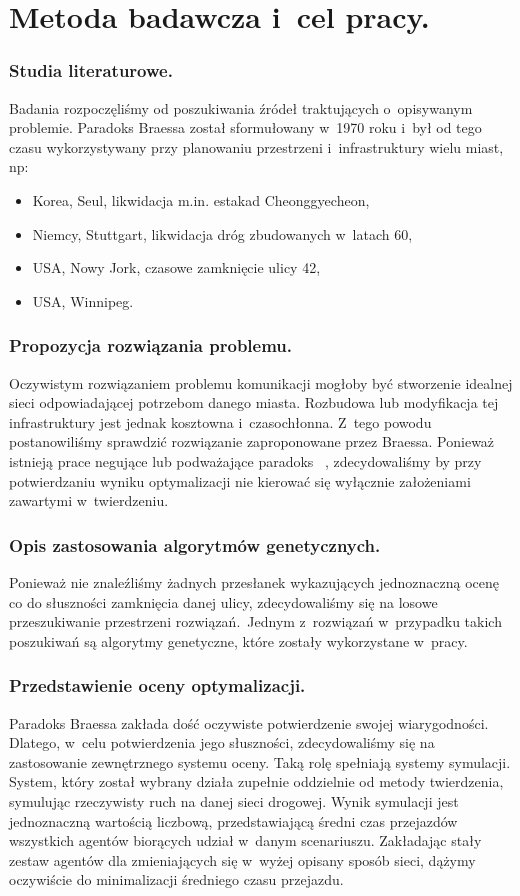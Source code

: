 \documentclass[twoside,12pt]{report}
\begin{document}
\section{Metoda badawcza i~cel pracy.}
\subsubsection{Studia literaturowe.}
Badania rozpoczęliśmy od poszukiwania źródeł traktujących o~opisywanym problemie. Paradoks Braessa został sformułowany w~1970 roku i~był od tego czasu wykorzystywany przy planowaniu przestrzeni i~infrastruktury wielu miast, np:

\begin{itemize}
\item Korea, Seul, likwidacja m.in. estakad Cheonggyecheon,
\item Niemcy, Stuttgart, likwidacja dróg zbudowanych w~latach 60,
\item USA, Nowy Jork, czasowe zamknięcie ulicy 42,
\item USA, Winnipeg.~\cite{urban}
\end{itemize}  

\subsubsection{Propozycja rozwiązania problemu.}
Oczywistym rozwiązaniem problemu komunikacji mogłoby być stworzenie idealnej sieci odpowiadającej potrzebom danego miasta. Rozbudowa lub modyfikacja tej infrastruktury jest jednak kosztowna i~czasochłonna. Z~tego powodu postanowiliśmy sprawdzić rozwiązanie zaproponowane przez Braessa. Ponieważ istnieją prace negujące lub podważające paradoks~\cite{newinsights} , zdecydowaliśmy by przy potwierdzaniu wyniku optymalizacji nie kierować się wyłącznie założeniami zawartymi w~twierdzeniu.

\subsubsection{Opis zastosowania algorytmów genetycznych.}
Ponieważ nie znaleźliśmy żadnych przesłanek wykazujących jednoznaczną ocenę co do słuszności zamknięcia danej ulicy, zdecydowaliśmy się na losowe przeszukiwanie przestrzeni rozwiązań.~Jednym z~rozwiązań w~przypadku takich poszukiwań są algorytmy genetyczne, które zostały wykorzystane w~pracy.

\subsubsection{Przedstawienie oceny optymalizacji.}
Paradoks Braessa zakłada dość oczywiste potwierdzenie swojej wiarygodności. Dlatego, w~celu potwierdzenia jego słuszności, zdecydowaliśmy się na zastosowanie zewnętrznego systemu oceny. Taką rolę spełniają systemy symulacji. System, który został wybrany działa zupełnie oddzielnie od metody twierdzenia, symulując rzeczywisty ruch na danej sieci drogowej. Wynik symulacji jest jednoznaczną wartością liczbową, przedstawiającą średni czas przejazdów wszystkich agentów biorących udział w~danym scenariuszu. Zakładając stały zestaw agentów dla zmieniających się w~wyżej opisany sposób sieci, dążymy oczywiście do minimalizacji średniego czasu przejazdu.
\end{document}

